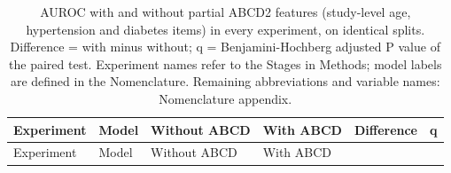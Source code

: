 \documentclass[
  11pt,
]{article}
\begin{document}
\begin{longtable}[]{@{}
  >{\raggedright\arraybackslash}p{}
  >{\raggedright\arraybackslash}p{}
  >{\raggedright\arraybackslash}p{}
  >{\raggedright\arraybackslash}p{}
  >{\raggedright\arraybackslash}p{}
  >{\raggedright\arraybackslash}p{}@{}}
\caption{AUROC with and without partial ABCD2 features (study-level age,
hypertension and diabetes items) in every experiment, on identical
splits. Difference = with minus without; q = Benjamini-Hochberg adjusted
P value of the paired test. Experiment names refer to the Stages in
Methods; model labels are defined in the Nomenclature. Remaining
abbreviations and variable names: Nomenclature appendix.}\tabularnewline
\toprule\noalign{}
\begin{minipage}[b]{\linewidth}\raggedright
Experiment
\end{minipage} & \begin{minipage}[b]{\linewidth}\raggedright
Model
\end{minipage} & \begin{minipage}[b]{\linewidth}\raggedright
Without ABCD
\end{minipage} & \begin{minipage}[b]{\linewidth}\raggedright
With ABCD
\end{minipage} & \begin{minipage}[b]{\linewidth}\raggedright
Difference
\end{minipage} & \begin{minipage}[b]{\linewidth}\raggedright
q
\end{minipage} \\
\midrule\noalign{}
\endfirsthead
\toprule\noalign{}
\begin{minipage}[b]{\linewidth}\raggedright
Experiment
\end{minipage} & \begin{minipage}[b]{\linewidth}\raggedright
Model
\end{minipage} & \begin{minipage}[b]{\linewidth}\raggedright
Without ABCD
\end{minipage} & \begin{minipage}[b]{\linewidth}\raggedright
With ABCD
\end{minipage} & \begin{minipage}[b]{\linewidth}\raggedright

\end{minipage}
\end{longtable}
\end{document}
